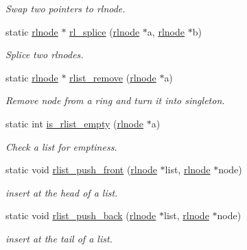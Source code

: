 \begin{DoxyCompactItemize}
\begin{DoxyCompactList}\small\item\em Swap two pointers to rlnode. \end{DoxyCompactList}\item 
static \hyperlink{group__rlists_ga8f6244877f7ce2322c90525217ea6e7a}{rlnode} $\ast$ \hyperlink{group__rlists_gac04dfecc68239457f673c0a63c254541}{rl\-\_\-splice} (\hyperlink{group__rlists_ga8f6244877f7ce2322c90525217ea6e7a}{rlnode} $\ast$a, \hyperlink{group__rlists_ga8f6244877f7ce2322c90525217ea6e7a}{rlnode} $\ast$b)
\begin{DoxyCompactList}\small\item\em Splice two rlnodes. \end{DoxyCompactList}\item 
static \hyperlink{group__rlists_ga8f6244877f7ce2322c90525217ea6e7a}{rlnode} $\ast$ \hyperlink{group__rlists_ga9177b286dcefd1d853aae220a98d3c7b}{rlist\-\_\-remove} (\hyperlink{group__rlists_ga8f6244877f7ce2322c90525217ea6e7a}{rlnode} $\ast$a)
\begin{DoxyCompactList}\small\item\em Remove node from a ring and turn it into singleton. \end{DoxyCompactList}\item 
static int \hyperlink{group__rlists_gaf60549214daf0df46bcd1a0d5ba5b661}{is\-\_\-rlist\-\_\-empty} (\hyperlink{group__rlists_ga8f6244877f7ce2322c90525217ea6e7a}{rlnode} $\ast$a)
\begin{DoxyCompactList}\small\item\em Check a list for emptiness. \end{DoxyCompactList}\item 
static void \hyperlink{group__rlists_ga63ab59e50f2007a6bfedb0180a73b06f}{rlist\-\_\-push\-\_\-front} (\hyperlink{group__rlists_ga8f6244877f7ce2322c90525217ea6e7a}{rlnode} $\ast$list, \hyperlink{group__rlists_ga8f6244877f7ce2322c90525217ea6e7a}{rlnode} $\ast$node)
\begin{DoxyCompactList}\small\item\em insert at the head of a list. \end{DoxyCompactList}\item 
static void \hyperlink{group__rlists_gac454004e8fb74ccd539e7fbd1affa86a}{rlist\-\_\-push\-\_\-back} (\hyperlink{group__rlists_ga8f6244877f7ce2322c90525217ea6e7a}{rlnode} $\ast$list, \hyperlink{group__rlists_ga8f6244877f7ce2322c90525217ea6e7a}{rlnode} $\ast$node)
\begin{DoxyCompactList}\small\item\em insert at the tail of a list. \end{DoxyCompactList}\item 

\end{DoxyCompactItemize}

